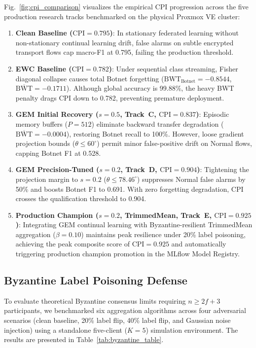\documentclass[journal,10pt,twocolumn]{IEEEtran}
\begin{document}
Fig.~\ref{fig:cpi_comparison} visualizes the empirical CPI progression across the five production research tracks benchmarked on the physical Proxmox VE cluster:
\begin{enumerate}
    \item \textbf{Clean Baseline ($\text{CPI} = 0.795$)}: In stationary federated learning without non-stationary continual learning drift, false alarms on subtle encrypted transport flows cap macro-F1 at 0.795, failing the production threshold.
    \item \textbf{EWC Baseline ($\text{CPI} = 0.782$)}: Under sequential class streaming, Fisher diagonal collapse causes total Botnet forgetting ($\text{BWT}_{\text{Botnet}} = -0.8544$, $\overline{\text{BWT}} = -0.1711$). Although global accuracy is 99.88\%, the heavy BWT penalty drags CPI down to 0.782, preventing premature deployment.
    \item \textbf{GEM Initial Recovery ($s=0.5$, Track~C, $\text{CPI} = 0.837$)}: Episodic memory buffers ($P=512$) eliminate backward transfer degradation ($\overline{\text{BWT}} = -0.0004$), restoring Botnet recall to 100\%. However, loose gradient projection bounds ($\theta \le 60^\circ$) permit minor false-positive drift on Normal flows, capping Botnet F1 at 0.528.
    \item \textbf{GEM Precision-Tuned ($s=0.2$, Track~D, $\text{CPI} = 0.904$)}: Tightening the projection margin to $s=0.2$ ($\theta \le 78.46^\circ$) suppresses Normal false alarms by 50\% and boosts Botnet F1 to 0.691. With zero forgetting degradation, CPI crosses the qualification threshold to 0.904.
    \item \textbf{Production Champion ($s=0.2$, TrimmedMean, Track~E, $\text{CPI} = 0.925$)}: Integrating GEM continual learning with Byzantine-resilient TrimmedMean aggregation ($\beta = 0.10$) maintains peak resilience under 20\% label poisoning, achieving the peak composite score of $\text{CPI} = 0.925$ and automatically triggering production champion promotion in the MLflow Model Registry.
\end{enumerate}

\subsection{Byzantine Label Poisoning Defense}
\label{sec:byzantine_eval}

To evaluate theoretical Byzantine consensus limits requiring $n \ge 2f + 3$ participants, we benchmarked six aggregation algorithms across four adversarial scenarios (clean baseline, 20\% label flip, 40\% label flip, and Gaussian noise injection) using a standalone five-client ($K=5$) simulation environment. The results are presented in Table~\ref{tab:byzantine_table}.
\end{document}
